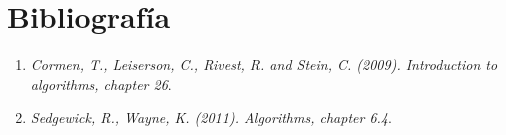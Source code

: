 \section{Bibliografía}

\begin{enumerate}
\item \textit{Cormen, T., Leiserson, C., Rivest, R. and Stein, C. (2009). Introduction to algorithms, chapter 26}.
\item  \textit{Sedgewick, R., Wayne, K. (2011). Algorithms, chapter 6.4}.
\end{enumerate}